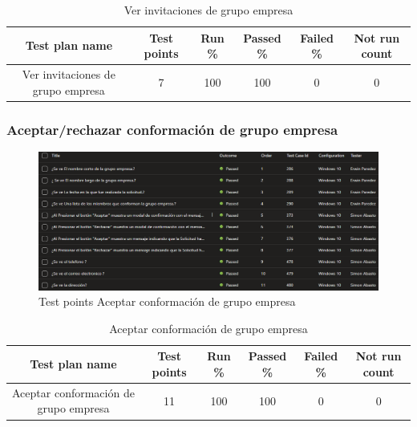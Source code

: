 \documentclass[12pt,letterpaper]{article}
\begin{document}
 \begin{table}[h] %
    \centering %
    \caption{Ver invitaciones de grupo empresa} %
    \begin{tabular}{|c|c|c|c|c|c|}
        \rowcolor{green} %
        \hline
        Test plan name & Test points & Run \% & Passed \% & Failed \% & Not run count \\
        \hline
        Ver invitaciones de grupo empresa & 7 & 100 & 100 & 0 & 0 \\
        \hline
    \end{tabular}
\end{table}


\subsubsection{Aceptar/rechazar conformación de grupo empresa}
\begin{figure}[H]
        \centering
        \includegraphics[width=1\linewidth]{cases aceptar conformacion de grupo empresa.png}
        \caption{Test points Aceptar conformación de grupo empresa}
    \end{figure}


 \begin{table}[h] %
    \centering %
    \caption{Aceptar conformación de grupo empresa} %
    \begin{tabular}{|c|c|c|c|c|c|}
        \rowcolor{green} %
        \hline
        Test plan name & Test points & Run \% & Passed \% & Failed \% & Not run count \\
        \hline
        Aceptar conformación de grupo empresa& 11 & 100 & 100 & 0 & 0 \\
        \hline
    \end{tabular}
\end{table}
\end{document}
